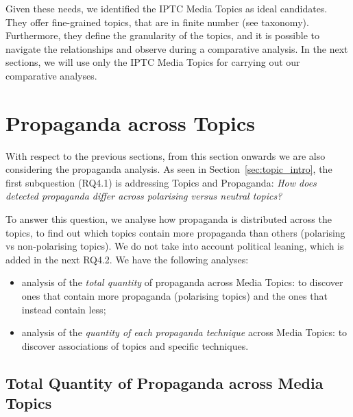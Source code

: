 Given these needs, we identified the IPTC Media Topics as ideal candidates.
They offer fine-grained topics, that are in finite number (see taxonomy). Furthermore, they define the granularity of the topics, and it is possible to navigate the relationships and observe during a comparative analysis.
In the next sections, we will use only the IPTC Media Topics for carrying out our comparative analyses.


\section{\statusgreen Propaganda across Topics}
\label{sec:topic_propaganda}

With respect to the previous sections, from this section onwards we are also considering the propaganda analysis.
As seen in Section~\ref{sec:topic_intro}, the first subquestion (RQ4.1) is addressing Topics and Propaganda:
\emph{How does detected propaganda differ across polarising versus neutral topics?}

To answer this question, we analyse how propaganda is distributed across the topics, to find out which topics contain more propaganda than others (polarising vs non-polarising topics).
We do not take into account political leaning, which is added in the next RQ4.2.
We have the following analyses:

\begin{itemize}
    \item analysis of the \emph{total quantity} of propaganda across Media Topics: to discover ones that contain more propaganda (polarising topics) and the ones that instead contain less;
    \item analysis of the \emph{quantity of each propaganda technique} across Media Topics: to discover associations of topics and specific techniques.
\end{itemize}

\subsection{\statusgreen Total Quantity of Propaganda across Media Topics}
\label{ssec:topic_propaganda_tot}

